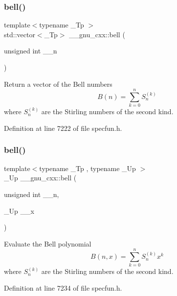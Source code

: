 \subsubsection{\texorpdfstring{bell()}{bell()}\hspace{0.1cm}{\footnotesize\ttfamily [1/2]}}
{\footnotesize\ttfamily template$<$typename \+\_\+\+Tp $>$ \\
std\+::vector$<$\+\_\+\+Tp$>$ \+\_\+\+\_\+gnu\+\_\+cxx\+::bell (\begin{DoxyParamCaption}\item[{unsigned int}]{\+\_\+\+\_\+n }\end{DoxyParamCaption})\hspace{0.3cm}{\ttfamily [inline]}}

Return a vector of the Bell numbers \[ B(n) = \sum_{k=0}^{n}S_n^{(k)} \] where $ S_n^{(k)} $ are the Stirling numbers of the second kind. 

Definition at line 7222 of file specfun.\+h.

\mbox{\label{group__gnu__math__spec__func_ga1e87244cb33a10de204856cafb19046f}} 
\subsubsection{\texorpdfstring{bell()}{bell()}\hspace{0.1cm}{\footnotesize\ttfamily [2/2]}}
{\footnotesize\ttfamily template$<$typename \+\_\+\+Tp , typename \+\_\+\+Up $>$ \\
\+\_\+\+Up \+\_\+\+\_\+gnu\+\_\+cxx\+::bell (\begin{DoxyParamCaption}\item[{unsigned int}]{\+\_\+\+\_\+n,  }\item[{\+\_\+\+Up}]{\+\_\+\+\_\+x }\end{DoxyParamCaption})\hspace{0.3cm}{\ttfamily [inline]}}

Evaluate the Bell polynomial \[ B(n,x) = \sum_{k=0}^{n}S_n^{(k)}x^k \] where $ S_n^{(k)} $ are the Stirling numbers of the second kind. 

Definition at line 7234 of file specfun.\+h.



